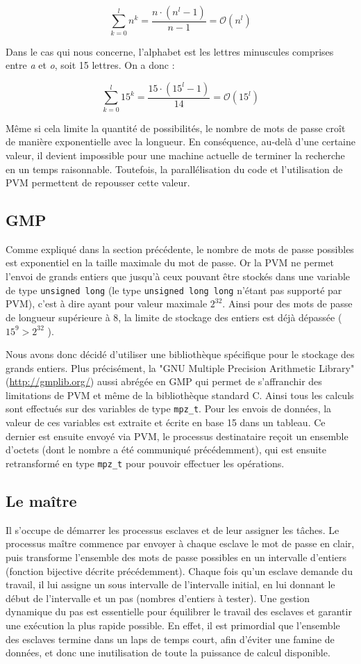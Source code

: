 \documentclass[a4paper,11pt]{article}
\begin{document}
\[
\sum_{k=0}^{l}n^k = \frac{n \cdot (n^l - 1)}{n - 1} = \mathcal{O}(n^l)
\]

Dans le cas qui nous concerne, l'alphabet est les lettres minuscules comprises entre \emph{a} et \emph{o}, soit 15 lettres. On a donc :

\[
\sum_{k=0}^{l}15^k = \frac{15 \cdot (15^l - 1)}{14} = \mathcal{O}(15^l)
\]

Même si cela limite la quantité de possibilités, le nombre de mots de passe croît de manière exponentielle avec la longueur. En conséquence, au-delà d'une certaine valeur, il devient impossible pour une machine actuelle de terminer la recherche en un temps raisonnable. Toutefois, la parallélisation du code et l'utilisation de PVM permettent de repousser cette valeur.

\subsection{GMP}
Comme expliqué dans la section précédente, le nombre de mots de passe possibles est exponentiel en la taille maximale du mot de passe. Or la PVM ne permet l'envoi de grands entiers que jusqu'à ceux pouvant être stockés dans une variable de type  \texttt{unsigned long} (le type \texttt{unsigned long long} n'étant pas supporté par PVM), c'est à dire ayant pour valeur maximale $2^{32}$. Ainsi pour des mots de passe de longueur supérieure à 8, la limite de stockage des entiers est déjà dépassée ($15^{9} > 2^{32}$ ). 

Nous avons donc décidé d'utiliser une bibliothèque spécifique pour le stockage des grands entiers. Plus précisément, la "GNU Multiple Precision Arithmetic Library" (\url{http://gmplib.org/}) aussi abrégée en GMP qui permet de s'affranchir des limitations de PVM et même de la bibliothèque standard C.
Ainsi tous les calculs sont effectués sur des variables de type \texttt{mpz\_t}. Pour les envois de données, la valeur de ces variables est extraite et écrite en base 15 dans un tableau. Ce dernier est ensuite envoyé via PVM, le processus destinataire reçoit un ensemble d'octets (dont le nombre a été communiqué précédemment), qui est ensuite retransformé en type \texttt{mpz\_t} pour pouvoir effectuer les opérations.



\subsection{Le maître}
Il s'occupe de démarrer les processus esclaves et de leur assigner les tâches. Le processus maître commence par envoyer à chaque esclave le mot de passe en clair, puis transforme l'ensemble des mots de passe possibles en un intervalle d'entiers (fonction bijective décrite précédemment). Chaque fois qu'un esclave demande du travail, il lui assigne un sous intervalle de l'intervalle initial, en lui donnant le début de l'intervalle et un pas (nombres d'entiers à tester).
Une gestion dynamique du pas est essentielle pour équilibrer le travail des esclaves et garantir une exécution la plus rapide possible. En effet, il est primordial que l'ensemble des esclaves termine dans un laps de temps court, afin d'éviter une famine de données, et donc une inutilisation de toute la puissance de calcul disponible.
\end{document}
